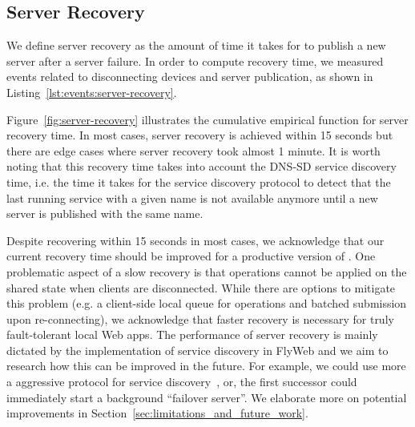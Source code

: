 \subsection{Server Recovery}
\label{sub:eval:server-recovery}

We define server recovery as the amount of time it takes for \APIName to publish a new server after a server failure.
In order to compute recovery time, we measured events related to disconnecting devices and server publication, as shown
in Listing~\ref{lst:events:server-recovery}. 

Figure~\ref{fig:server-recovery} illustrates the cumulative empirical function for server recovery time.
In most cases, server recovery is achieved within 15 seconds but there are edge cases where server recovery took almost 1 minute. 
It is worth noting that this recovery time takes into account the DNS-SD service discovery time, i.e. the time it takes for the service discovery protocol to detect that the last running service with a given name is not available anymore until a new server is published with the same name. 

Despite recovering within 15 seconds in most cases, we acknowledge that our current recovery time should be improved for a productive version of \APINameNoSpace. 
One problematic aspect of a slow recovery is that operations cannot be applied on the shared state when clients are disconnected. 
While there are options to mitigate this problem (e.g. a client-side local queue for operations and batched submission upon re-connecting), we acknowledge that faster recovery is necessary for truly fault-tolerant local Web apps.
The performance of server recovery is mainly dictated by the implementation of service discovery in FlyWeb and we aim to research how this can be improved in the future.
For example, we could use more a aggressive protocol for service discovery~\cite{hong2007accelerating}, or, the first successor could immediately start a background ``failover server''.  
We elaborate more on potential improvements in Section~\ref{sec:limitations_and_future_work}.